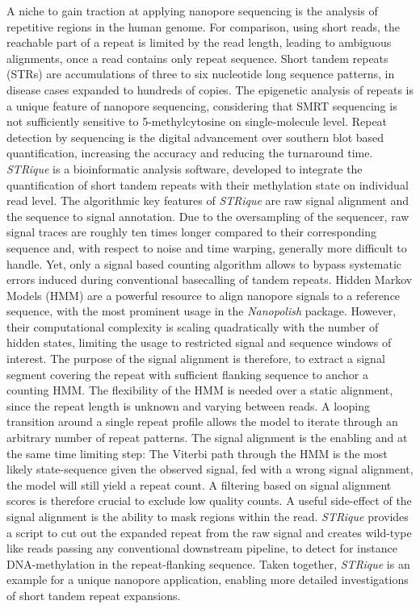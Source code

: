 A niche to gain traction at applying nanopore sequencing is the analysis of repetitive regions in the human genome.
For comparison, using short reads, the reachable part of a repeat is limited by the read length, leading to ambiguous alignments, once a read contains only repeat sequence.
Short tandem repeats (STRs) are accumulations of three to six nucleotide long sequence patterns, in disease cases expanded to hundreds of copies.
The epigenetic analysis of repeats is a unique feature of nanopore sequencing, considering that SMRT sequencing is not sufficiently sensitive to 5-methylcytosine on single-molecule level.
Repeat detection by sequencing is the digital advancement over southern blot based quantification, increasing the accuracy and reducing the turnaround time.
\textit{STRique} is a bioinformatic analysis software, developed to integrate the quantification of short tandem repeats with their methylation state on individual read level.
The algorithmic key features of \textit{STRique} are raw signal alignment and the sequence to signal annotation.
Due to the oversampling of the sequencer, raw signal traces are roughly ten times longer compared to their corresponding sequence and, with respect to noise and time warping, generally more difficult to handle.
Yet, only a signal based counting algorithm allows to bypass systematic errors induced during conventional basecalling of tandem repeats.
Hidden Markov Models (HMM) are a powerful resource to align nanopore signals to a reference sequence, with the most prominent usage in the \textit{Nanopolish} package.
However, their computational complexity is scaling quadratically with the number of hidden states, limiting the usage to restricted signal and sequence windows of interest.
The purpose of the signal alignment is therefore, to extract a signal segment covering the repeat with sufficient flanking sequence to anchor a counting HMM.
The flexibility of the HMM is needed over a static alignment, since the repeat length is unknown and varying between reads.
A looping transition around a single repeat profile allows the model to iterate through an arbitrary number of repeat patterns.
The signal alignment is the enabling and at the same time limiting step: The Viterbi path through the HMM is the most likely state-sequence given the observed signal, fed with a wrong signal alignment, the model will still yield a repeat count.
A filtering based on signal alignment scores is therefore crucial to exclude low quality counts.
A useful side-effect of the signal alignment is the ability to mask regions within the read.
\textit{STRique} provides a script to cut out the expanded repeat from the raw signal and creates wild-type like reads passing any conventional downstream pipeline, to detect for instance DNA-methylation in the repeat-flanking sequence.
Taken together, \textit{STRique} is an example for a unique nanopore application, enabling more detailed investigations of short tandem repeat expansions.

